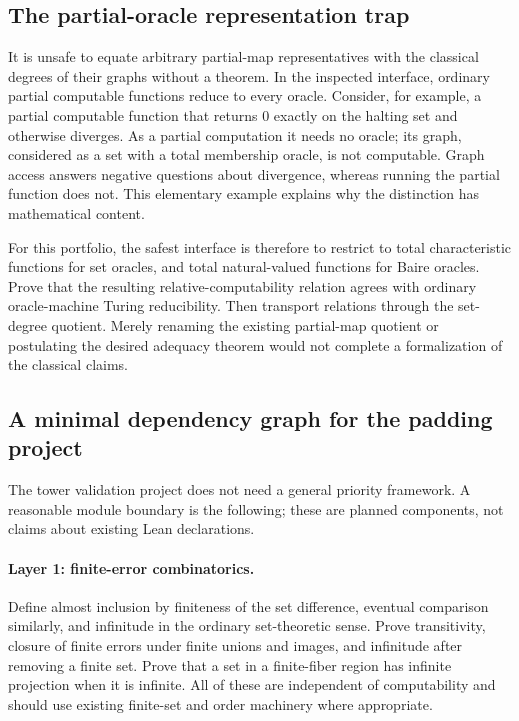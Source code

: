 \documentclass[11pt,a4paper]{article}
\theoremstyle{definition}\newtheorem{definition}[theorem]{Definition}
\theoremstyle{remark}\newtheorem{remark}[theorem]{Remark}
\begin{document}
\subsection{The partial-oracle representation trap}
It is unsafe to equate arbitrary partial-map representatives with the
classical degrees of their graphs without a theorem. In the inspected
interface, ordinary partial computable functions reduce to every oracle.
Consider, for example, a partial computable function that returns $0$ exactly
on the halting set and otherwise diverges. As a partial computation it needs
no oracle; its graph, considered as a set with a total membership oracle, is
not computable. Graph access answers negative questions about divergence,
whereas running the partial function does not. This elementary example
explains why the distinction has mathematical content.

For this portfolio, the safest interface is therefore to restrict to total
characteristic functions for set oracles, and total natural-valued functions
for Baire oracles. Prove that the resulting relative-computability relation
agrees with ordinary oracle-machine Turing reducibility. Then transport
relations through the set-degree quotient. Merely renaming the existing
partial-map quotient or postulating the desired adequacy theorem would not
complete a formalization of the classical claims.

\subsection{A minimal dependency graph for the padding project}
The tower validation project does not need a general priority framework. A reasonable
module boundary is the following; these are planned components, not claims
about existing Lean declarations.

\paragraph{Layer 1: finite-error combinatorics.}
Define almost inclusion by finiteness of the set difference, eventual
comparison similarly, and infinitude in the ordinary set-theoretic sense.
Prove transitivity, closure of finite errors under finite unions and images,
and infinitude after removing a finite set. Prove that a set in a finite-fiber
region has infinite projection when it is infinite. All of these are
independent of computability and should use existing finite-set and order
machinery where appropriate.
\end{document}
